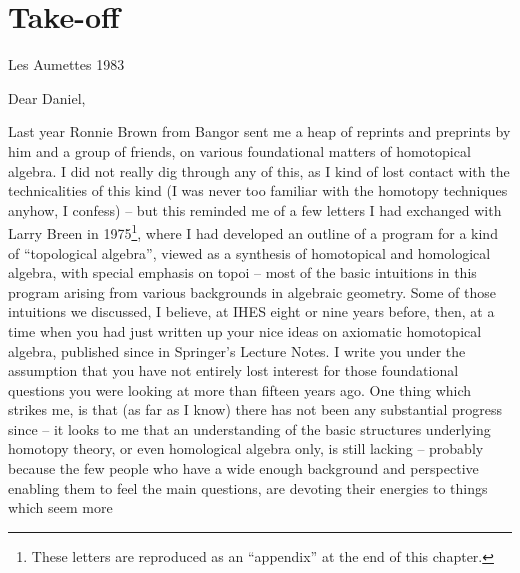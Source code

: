 










\chapter{Take-off}
\label{ch:I}

\par\hfill Les Aumettes 1983\par

Dear Daniel,

\label{sec:1}%
Last year Ronnie Brown from Bangor sent me a heap of reprints and
preprints by him and a group of friends, on various foundational
matters of homotopical algebra. I did not really dig through any of
this, as I kind of lost contact with the technicalities of this kind
(I was never too familiar with the homotopy techniques anyhow, I
confess) -- but this reminded me of a few letters I had exchanged with
Larry Breen in 1975\footnote{These letters are reproduced as an 
``appendix'' at the end of this chapter.}, where I had developed an outline of a program for
a kind of ``topological algebra'', viewed as a synthesis of
homotopical and homological algebra, with special emphasis on topoi --
most of the basic intuitions in this program arising from various
backgrounds in algebraic geometry. Some of those intuitions we
discussed, I believe, at IHES eight or nine years before, then, at a time
when you had just written up your nice ideas on axiomatic homotopical
algebra, published since in
Springer's Lecture Notes. I write you under the assumption that you
have not entirely lost interest for those foundational questions you
were looking at more than fifteen years ago. One thing which strikes
me, is that (as far as I know) there has not been any substantial
progress since -- it looks to me that an understanding of the basic
structures underlying homotopy theory, or even homological algebra
only, is still lacking -- probably because the few people who have a
wide enough background and perspective enabling them to feel the main
questions, are devoting their energies to things which seem more
